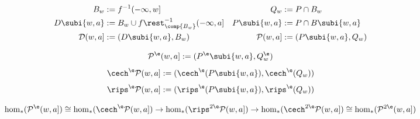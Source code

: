 
\begin{align*}
  B_w&:=f^{-1}(-\infty,w] & Q_w&:=P\cap B_w\\
  D\subi{w,a}&:=B_w\cup f\rest_{\comp{B_w}}^{-1}(-\infty,a] &   P\subi{w,a}&:=P\cap B\subi{w,a}\\
  \mathcal{D}(w,a]&:=(D\subi{w,a}, B_w) &  \mathcal{P}(w,a]&:=(P\subi{w,a}, Q_w)\\
\end{align*}

\[ \mathcal{P}^\e(w,a]:=(P^\e\subi{w,a}, Q^\e_w)\]
\[ \cech^\e\mathcal{P}(w,a]:=(\cech^\e(P\subi{w,a}), \cech^\e(Q_w))\]
\[ \rips^\e\mathcal{P}(w,a]:=(\rips^\e(P\subi{w,a}), \rips^\e(Q_w)) \]

\[\hom_*(\mathcal{P}^\e(w,a])
  \cong\hom_*(\cech^\e\mathcal{P}(w,a])
  \to\hom_*(\rips^{2\e}\mathcal{P}(w,a])
  \to\hom_*(\cech^{2\e}\mathcal{P}(w,a])
  \cong\hom_*(\mathcal{P}^{2\e}(w,a])\]

